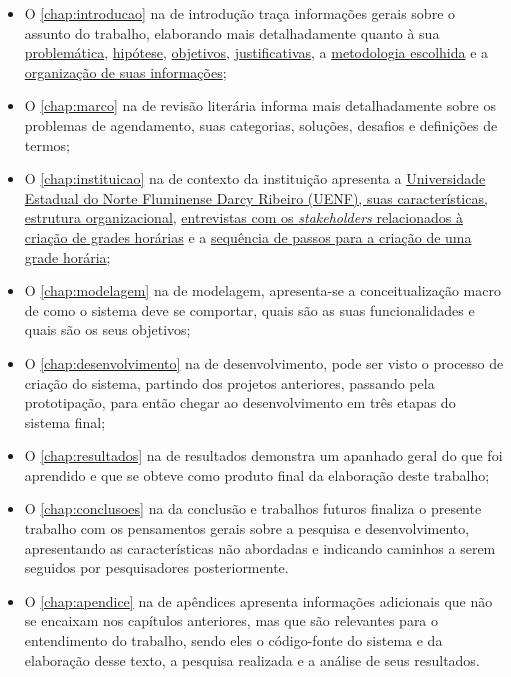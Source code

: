 \begin{itemize}
  \item O \autoref{chap:introducao} na  de introdução traça informações gerais sobre o assunto do trabalho, elaborando mais detalhadamente quanto à sua \hyperref[sec:Problemáticas]{problemática}, \hyperref[sec:Hipótese]{hipótese}, \hyperref[sec:Objetivos]{objetivos}, \hyperref[sec:Justificativas]{justificativas}, a \hyperref[sec:Metodologia]{metodologia escolhida} e a \hyperref[sec:Organização]{organização de suas informações};
  \item O \autoref{chap:marco} na  de revisão literária informa mais detalhadamente sobre os problemas de agendamento, suas categorias, soluções, desafios e definições de termos;
  \item O \autoref{chap:instituicao} na  de contexto da instituição apresenta a \hyperref[sec:estatuto]{Universidade Estadual do Norte Fluminense Darcy Ribeiro (UENF), suas características, estrutura organizacional}, \hyperref[sec:entrevistas]{entrevistas com os \textit{stakeholders} relacionados à criação de grades horárias} e a \hyperref[sec:sequencia]{sequência de passos para a criação de uma grade horária};
  \item O \autoref{chap:modelagem} na  de modelagem, apresenta-se a conceitualização macro de como o sistema deve se comportar, quais são as suas funcionalidades e quais são os seus objetivos;
  \item O \autoref{chap:desenvolvimento} na  de desenvolvimento, pode ser visto o processo de criação do sistema, partindo dos projetos anteriores, passando pela prototipação, para então chegar ao desenvolvimento em três etapas do sistema final;
  \item O \autoref{chap:resultados} na  de resultados demonstra um apanhado geral do que foi aprendido e que se obteve como produto final da elaboração deste trabalho;
  \item O \autoref{chap:conclusoes} na  da conclusão e trabalhos futuros finaliza o presente trabalho com os pensamentos gerais sobre a pesquisa e desenvolvimento, apresentando as características não abordadas e indicando caminhos a serem seguidos por pesquisadores posteriormente.
  \item O \autoref{chap:apendice} na  de apêndices apresenta informações adicionais que não se encaixam nos capítulos anteriores, mas que são relevantes para o entendimento do trabalho, sendo eles o código-fonte do sistema e da elaboração desse texto, a pesquisa realizada e a análise de seus resultados.
\end{itemize}
